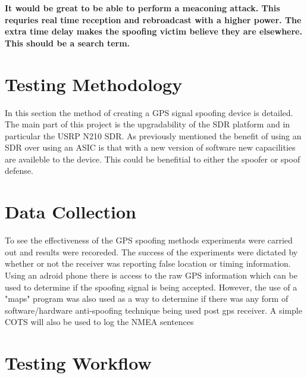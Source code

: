 \textbf{It would be great to be able to perform a meaconing attack. This requries real time reception and rebroadcast with a higher power. The extra time delay
makes the spoofing victim believe they are elsewhere. This should be a search term.}


\section{Testing Methodology}

In this section the method of creating a GPS signal spoofing device is detailed. The main part of this project is the upgradability of the SDR platform
and in particular the USRP N210 SDR. As previously mentioned the benefit of using an SDR over using an ASIC is that with a new version of software 
new capacilities are availeble to the device. This could be benefitial to either the spoofer or spoof defense. 

\section{Data Collection}

To see the effectiveness of the GPS spoofing methods experiments were carried out and results were recoreded. The success of the experiments were dictated by whether or
not the receiver was reporting false location or timing information. Using an adroid phone there is access to the raw GPS information which can be used to determine if
the spoofing signal is being accepted. However, the use of a "maps" program was also used as a way to determine if there was any form of software/hardware anti-spoofing
technique being used post gps receiver. A simple COTS will also be used to log the NMEA sentences 

\section{Testing Workflow}

